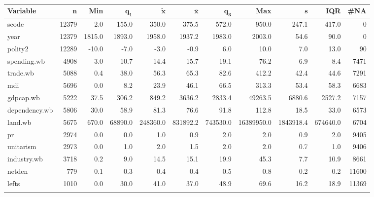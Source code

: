 \begin{longtable}{lrrrrrrrrrr}
 \textbf{Variable} & $\mathbf{n}$ & \textbf{Min} & $\mathbf{q_1}$ & $\mathbf{\widetilde{x}}$ & $\mathbf{\bar{x}}$ & $\mathbf{q_3}$ & \textbf{Max} & $\mathbf{s}$ & \textbf{IQR} & \textbf{\#NA} \\ 
  \hline
scode & 12379 &    2.0 &   155.0 &    350.0 &    375.5 &    572.0 &      950.0 &     247.1 &    417.0 &     0 \\ 
  year & 12379 & 1815.0 &  1893.0 &   1958.0 &   1937.2 &   1983.0 &     2003.0 &      54.6 &     90.0 &     0 \\ 
  polity2 & 12289 &  -10.0 &    -7.0 &     -3.0 &     -0.9 &      6.0 &       10.0 &       7.0 &     13.0 &    90 \\ 
  spending.wb &  4908 &    3.0 &    10.7 &     14.4 &     15.7 &     19.1 &       76.2 &       6.9 &      8.4 &  7471 \\ 
  trade.wb &  5088 &    0.4 &    38.0 &     56.3 &     65.3 &     82.6 &      412.2 &      42.4 &     44.6 &  7291 \\ 
  mdi &  5696 &    0.0 &     8.2 &     23.9 &     46.1 &     66.5 &      313.3 &      53.4 &     58.3 &  6683 \\ 
  gdpcap.wb &  5222 &   37.5 &   306.2 &    849.2 &   3636.2 &   2833.4 &    49263.5 &    6880.6 &   2527.2 &  7157 \\ 
  dependency.wb &  5806 &   30.0 &    58.9 &     81.3 &     76.6 &     91.8 &      112.8 &      18.5 &     33.0 &  6573 \\ 
  land.wb &  5675 &  670.0 & 68890.0 & 248360.0 & 831892.2 & 743530.0 & 16389950.0 & 1843918.4 & 674640.0 &  6704 \\ 
  pr &  2974 &    0.0 &     0.0 &      1.0 &      0.9 &      2.0 &        2.0 &       0.9 &      2.0 &  9405 \\ 
  unitarism &  2973 &    0.0 &     1.0 &      2.0 &      1.5 &      2.0 &        2.0 &       0.7 &      1.0 &  9406 \\ 
  industry.wb &  3718 &    0.2 &     9.0 &     14.5 &     15.1 &     19.9 &       45.3 &       7.7 &     10.9 &  8661 \\ 
  netden &   779 &    0.1 &     0.3 &      0.4 &      0.4 &      0.5 &        0.8 &       0.2 &      0.2 & 11600 \\ 
  lefts &  1010 &    0.0 &    30.0 &     41.0 &     37.0 &     48.9 &       69.6 &      16.2 &     18.9 & 11369 \\ 
  \hline
\caption{}
\label{}
\end{longtable}
